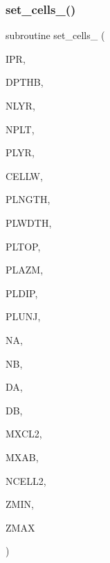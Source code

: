 \subsubsection{\texorpdfstring{set\+\_\+cells\+\_()}{set\_cells\_1()}}
{\footnotesize\ttfamily subroutine set\+\_\+cells\+\_ (\begin{DoxyParamCaption}\item[{integer}]{I\+PR,  }\item[{real}]{D\+P\+T\+HB,  }\item[{integer}]{N\+L\+YR,  }\item[{integer}]{N\+P\+LT,  }\item[{integer, dimension(nplt)}]{P\+L\+YR,  }\item[{real}]{C\+E\+L\+LW,  }\item[{real, dimension(nplt)}]{P\+L\+N\+G\+TH,  }\item[{real, dimension(nplt)}]{P\+L\+W\+D\+TH,  }\item[{real, dimension(nplt)}]{P\+L\+T\+OP,  }\item[{real, dimension(nplt)}]{P\+L\+A\+ZM,  }\item[{real, dimension(nplt)}]{P\+L\+D\+IP,  }\item[{real, dimension(nplt)}]{P\+L\+U\+NJ,  }\item[{integer, dimension(nplt)}]{NA,  }\item[{integer, dimension(nplt)}]{NB,  }\item[{real, dimension(nplt)}]{DA,  }\item[{real, dimension(nplt)}]{DB,  }\item[{integer}]{M\+X\+C\+L2,  }\item[{integer}]{M\+X\+AB,  }\item[{integer, dimension(0\+:nplt)}]{N\+C\+E\+L\+L2,  }\item[{real}]{Z\+M\+IN,  }\item[{real}]{Z\+M\+AX }\end{DoxyParamCaption})}

